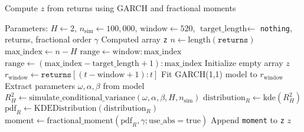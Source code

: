 \begin{center}
\begin{minipage}{0.9 \textwidth}
\begin{algorithm}[H]
\caption{Compute $z$ from returns using GARCH and fractional moments}
\label{alg:compute_z}
\begin{algorithmic}[1]
\REQUIRE Parameters: $H \gets 2$, $n_{\text{sim}} \gets 100{,}000$, $\text{window} \gets 520$, $\text{target\_length} \gets$ \texttt{nothing}, returns, fractional order $\gamma$
\ENSURE Computed array \texttt{z}
\STATE 
\STATE $n \gets \text{length}(\texttt{returns})$
\STATE $\text{max\_index} \gets n - H$
    \STATE $\text{range} \gets \text{window} : \text{max\_index}$
\ELSE
    \STATE $\text{range} \gets (\text{max\_index} - \text{target\_length} + 1) : \text{max\_index}$
\ENDIF
\STATE Initialize empty array $z$
    \STATE $r_{\text{window}} \gets \texttt{returns}[(t - \text{window} + 1) : t]$
    \STATE Fit GARCH(1,1) model to $r_{\text{window}}$
    \STATE Extract parameters $\omega, \alpha, \beta$ from model
    \STATE $R_{H}^{2} \gets \text{simulate\_conditional\_variance}(\omega, \alpha, \beta, H, n_{\text{sim}})$
    \STATE $\text{distribution}_R \gets \text{kde}(R_{H}^{2})$
    \STATE $\text{pdf}_R \gets \text{KDEDistribution}(\text{distribution}_R)$
    \STATE $\text{moment} \gets \text{fractional\_moment}(\text{pdf}_R, \gamma; \text{use\_abs} = \text{true})$
    \STATE Append \texttt{moment} to \texttt{z}
\ENDFOR
\RETURN $z$
\end{algorithmic}
\end{algorithm}
\end{minipage}
\end{center}

\clearpage

